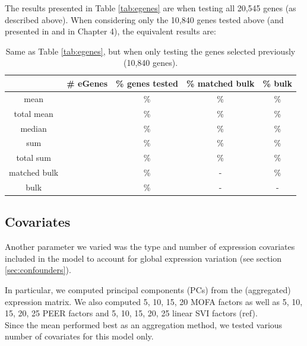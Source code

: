 \newpage

The results presented in Table \ref{tab:egenes} are when testing all 20,545 genes (as described above).
When considering only the 10,840 genes tested above (and presented in \cite{cuomo2020single} and in Chapter 4), the equivalent results are:

\begin{table}[h]
    \centering
    \begin{tabular}{c|c c c c }
    & \# eGenes & \% genes tested & \% matched bulk  & \% bulk   \\
    \hline
    mean         &  & \% & \% & \% \\
    total mean   &  & \% & \% & \% \\
    median       &  & \% & \% & \% \\
    sum          &  & \% & \% & \% \\
    total sum    &  & \% & \% & \% \\
    matched bulk &  & \% & - & \% \\
    bulk         &  & \% & - & - \\
    \end{tabular}
    \caption[Aggregation method comparison, genes from Cuomo \textit{et al.} only]{Same as Table \ref{tab:egenes},  but when only testing the genes selected previously (10,840 genes).}
    \label{tab:egenes_annas_selection}
\end{table}

\clearpage

\subsection{Covariates}


Another parameter we varied was the type and number of expression covariates included in the model to account for global expression variation (see section \ref{sec:confounders}).

In particular, we computed principal components (PCs) from the (aggregated) expression matrix.
We also computed 5, 10, 15, 20 MOFA factors \cite{argelaguet2018multi} as well as 5, 10, 15, 20, 25 PEER factors \cite{stegle2010bayesian,stegle2012using} and 5, 10, 15, 20, 25 linear SVI factors (ref). \\

Since the mean performed best as an aggregation method, we tested various number of covariates for this model only.

